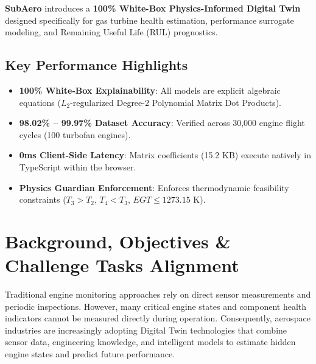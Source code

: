 \documentclass[11pt,a4paper]{article}
\begin{document}
\textbf{SubAero} introduces a \textbf{100\% White-Box Physics-Informed Digital Twin} designed specifically for gas turbine health estimation, performance surrogate modeling, and Remaining Useful Life (RUL) prognostics.

\subsection{Key Performance Highlights}
\begin{itemize}
    \item \textbf{100\% White-Box Explainability}: All models are explicit algebraic equations ($L_2$-regularized Degree-2 Polynomial Matrix Dot Products).
    \item \textbf{98.02\% -- 99.97\% Dataset Accuracy}: Verified across 30,000 engine flight cycles (100 turbofan engines).
    \item \textbf{0ms Client-Side Latency}: Matrix coefficients (15.2 KB) execute natively in TypeScript within the browser.
    \item \textbf{Physics Guardian Enforcement}: Enforces thermodynamic feasibility constraints ($T_3 > T_2$, $T_4 < T_3$, $EGT \le 1273.15$ K).
\end{itemize}

\section{Background, Objectives \& Challenge Tasks Alignment}
Traditional engine monitoring approaches rely on direct sensor measurements and periodic inspections. However, many critical engine states and component health indicators cannot be measured directly during operation. Consequently, aerospace industries are increasingly adopting Digital Twin technologies that combine sensor data, engineering knowledge, and intelligent models to estimate hidden engine states and predict future performance.
\end{document}
